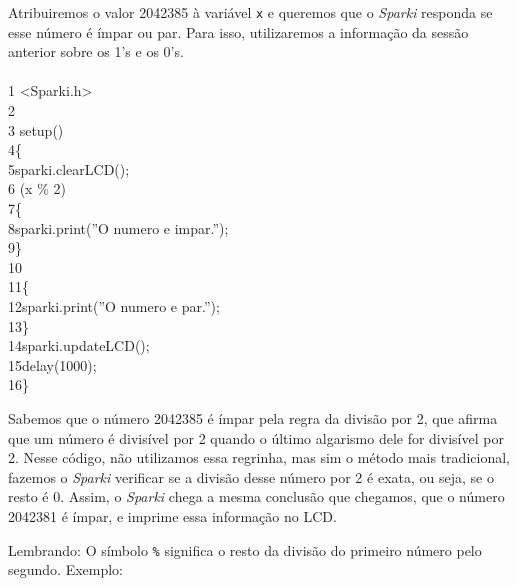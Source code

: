 \documentclass[conference]{IEEEtran}
\begin{document}
Atribuiremos o valor 2042385 à variável \texttt{x} e queremos que o \textit{Sparki} responda se esse número é ímpar ou par. Para isso, utilizaremos a informação da sessão anterior sobre os 1's e os 0's.
\\
\\
{\selectfont
{\color{cinza}1} <Sparki.h>\\
{\color{cinza}2}\\
{\color{cinza}3} setup()\\
{\color{cinza}4}\quad\{\\
{\color{cinza}5}\quad\quad sparki.clearLCD();\\
{\color{cinza}6}\quad{} (x \% 2)\\
{\color{cinza}7}\quad\quad \{\\
{\color{cinza}8}\quad\quad\quad sparki.print({\color{verde}''O numero e impar.''});\\
{\color{cinza}9}\quad\quad \}\\
{\color{cinza}10}\quad{}\\
{\color{cinza}11}\quad\quad \{\\
{\color{cinza}12}\quad\quad\quad sparki.print({\color{verde}''O numero e par.''});\\
{\color{cinza}13}\quad\quad \}\\
{\color{cinza}14}\quad\quad sparki.updateLCD();\\
{\color{cinza}15}\quad\quad delay(1000);\\
{\color{cinza}16}\quad\}}
\\
\par
Sabemos que o número 2042385 é ímpar pela regra da divisão por 2, que afirma que um número é divisível por 2 quando o último algarismo dele for divisível por 2. Nesse código, não utilizamos essa regrinha, mas sim o método mais tradicional, fazemos o \textit{Sparki} verificar se a divisão desse número por 2 é exata, ou seja, se o resto é 0. Assim, o \textit{Sparki} chega a mesma conclusão que chegamos, que o número 2042381 é ímpar, e imprime essa informação no LCD.
\par
Lembrando: O símbolo \texttt{\%} significa o resto da divisão do primeiro número pelo segundo. Exemplo:
\end{document}
